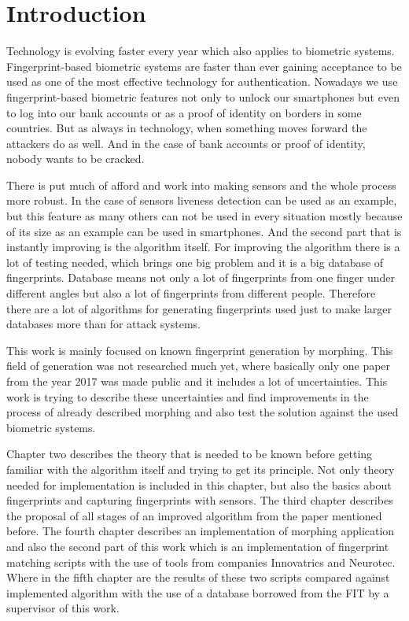 \chapter{Introduction}
Technology is evolving faster every year which also applies to biometric systems. Fingerprint-based biometric systems are faster than ever gaining acceptance to be used as one of the most effective technology for authentication. Nowadays we use fingerprint-based biometric features not only to unlock our smartphones but even to log into our bank accounts or as a proof of identity on borders in some countries. But as always in technology, when something moves forward the attackers do as well. And in the case of bank accounts or proof of identity, nobody wants to be cracked.

There is put much of afford and work into making sensors and the whole process more robust. In the case of sensors liveness detection can be used as an example, but this feature as many others can not be used in every situation mostly because of its size as an example can be used in smartphones. And the second part that is instantly improving is the algorithm itself. For improving the algorithm there is a lot of testing needed, which brings one big problem and it is a big database of fingerprints. Database means not only a lot of fingerprints from one finger under different angles but also a lot of fingerprints from different people. Therefore there are a lot of algorithms for generating fingerprints used just to make larger databases more than for attack systems.

This work is mainly focused on known fingerprint generation by morphing. This field of generation was not researched much yet, where basically only one paper from the year 2017 was made public and it includes a lot of uncertainties. This work is trying to describe these uncertainties and find improvements in the process of already described morphing and also test the solution against the used biometric systems.

Chapter two describes the theory that is needed to be known before getting familiar with the algorithm itself and trying to get its principle. Not only theory needed for implementation is included in this chapter, but also the basics about fingerprints and capturing fingerprints with sensors. The third chapter describes the proposal of all stages of an improved algorithm from the paper mentioned before. The fourth chapter describes an implementation of morphing application and also the second part of this work which is an implementation of fingerprint matching scripts with the use of tools from companies Innovatrics and Neurotec. Where in the fifth chapter are the results of these two scripts compared against implemented algorithm with the use of a database borrowed from the FIT by a supervisor of this work. 

